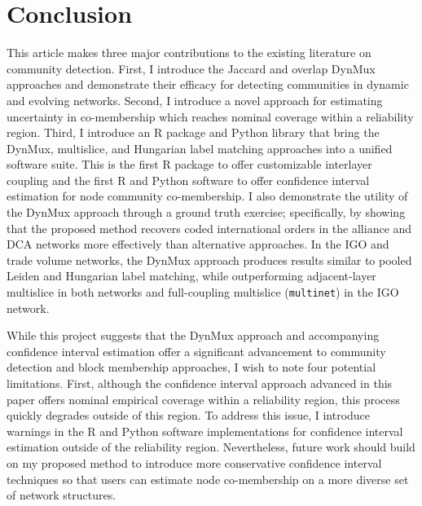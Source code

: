 \documentclass[11pt, letterpaper]{article}
\begin{document}
\section{Conclusion}
This article makes three major contributions to the existing literature on community detection. First, I introduce the Jaccard and overlap DynMux approaches and demonstrate their efficacy for detecting communities in dynamic and evolving networks. Second, I introduce a novel approach for estimating uncertainty in co-membership which reaches nominal coverage within a reliability region. Third, I introduce an R package and Python library that bring the DynMux, multislice, and Hungarian label matching approaches into a unified software suite. This is the first R package to offer customizable interlayer coupling and the first R and Python software to offer confidence interval estimation for node community co-membership.  I also demonstrate the utility of the DynMux approach through a ground truth exercise; specifically, by showing that the proposed method recovers coded international orders in the alliance and DCA networks more effectively than alternative approaches. In the IGO and trade volume networks, the DynMux approach produces results similar to pooled Leiden and Hungarian label matching, while outperforming adjacent-layer multislice in both networks and full-coupling multislice (\texttt{multinet}) in the IGO network.

While this project suggests that the DynMux approach and accompanying confidence interval estimation offer a significant advancement to community detection and block membership approaches, I wish to note four potential limitations. First, although the confidence interval approach advanced in this paper offers nominal empirical coverage within a reliability region, this process quickly degrades outside of this region. To address this issue, I introduce warnings in the R and Python software implementations for confidence interval estimation outside of the reliability region. Nevertheless, future work should build on my proposed method to introduce more conservative confidence interval techniques so that users can estimate node co-membership on a more diverse set of network structures. 
\end{document}
